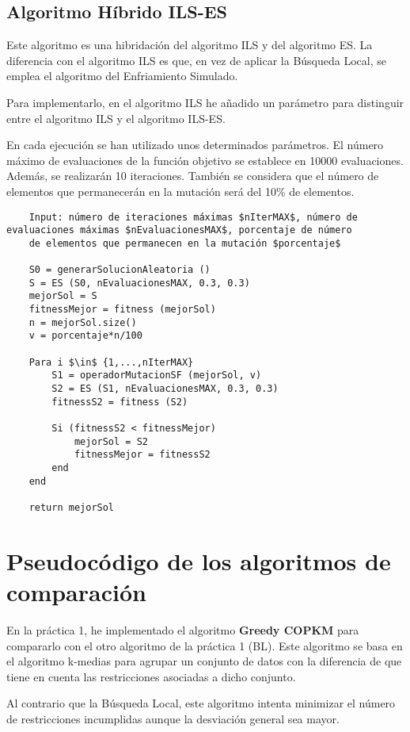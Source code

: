 	\subsection{Algoritmo Híbrido ILS-ES}
	
	Este algoritmo es una hibridación del algoritmo ILS y del algoritmo ES. La diferencia con el algoritmo ILS es que, en vez 
	de aplicar la Búsqueda Local, se emplea el algoritmo del Enfriamiento Simulado.

	Para implementarlo, en el algoritmo ILS he añadido un parámetro para distinguir entre el algoritmo ILS y el algoritmo ILS-ES.

	En cada ejecución se han utilizado unos determinados parámetros. El número máximo de 
	evaluaciones de la función objetivo se establece en 10000 evaluaciones. Además, se realizarán 
	10 iteraciones. También se considera que el número de elementos que permanecerán en la mutación será 
	del 10\% de elementos.

	\footnotesize
	\begin{lstlisting}
	Input: número de iteraciones máximas $nIterMAX$, número de evaluaciones máximas $nEvaluacionesMAX$, porcentaje de número 
	de elementos que permanecen en la mutación $porcentaje$

	S0 = generarSolucionAleatoria ()
	S = ES (S0, nEvaluacionesMAX, 0.3, 0.3)
	mejorSol = S 
	fitnessMejor = fitness (mejorSol)
	n = mejorSol.size()
	v = porcentaje*n/100

	Para i $\in$ {1,...,nIterMAX}
		S1 = operadorMutacionSF (mejorSol, v)
		S2 = ES (S1, nEvaluacionesMAX, 0.3, 0.3)
		fitnessS2 = fitness (S2)

		Si (fitnessS2 < fitnessMejor)
			mejorSol = S2
			fitnessMejor = fitnessS2 
		end 
	end
		
	return mejorSol 
	\end{lstlisting}
	\normalsize

\newpage

\section{Pseudocódigo de los algoritmos de comparación}
		En la práctica 1, he implementado el algoritmo \textbf{Greedy COPKM} para compararlo con el otro algoritmo de la práctica 1 (BL).
		Este algoritmo se basa en el algoritmo k-medias para agrupar un conjunto de datos con la diferencia de que tiene en cuenta 
		las restricciones asociadas a dicho conjunto.

		Al contrario que la Búsqueda Local, este algoritmo intenta minimizar el número de restricciones incumplidas aunque la desviación general 
		sea mayor.

